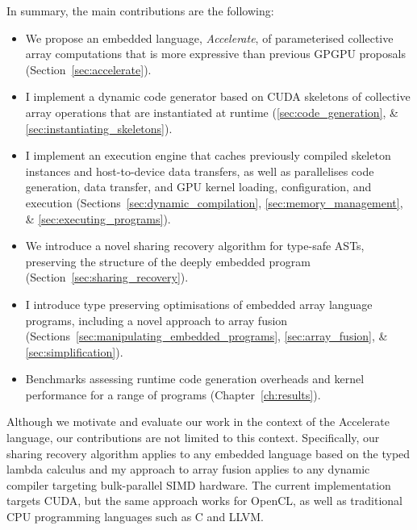 In summary, the main contributions are the following:
%
\begin{itemize}
    \item We propose an embedded language, \emph{Accelerate}, of parameterised
        collective array computations that is more expressive than previous
        GPGPU proposals (Section~\ref{sec:accelerate}).

    \item I implement a dynamic code generator based on CUDA skeletons of
        collective array operations that are instantiated at runtime
        (\ref{sec:code_generation}, \& \ref{sec:instantiating_skeletons}).

    \item I implement an execution engine that caches previously compiled
        skeleton instances and host-to-device data transfers, as well as
        parallelises code generation, data transfer, and GPU kernel loading,
        configuration, and execution (Sections~\ref{sec:dynamic_compilation},
        \ref{sec:memory_management}, \&
        \ref{sec:executing_programs}).

    \item We introduce a novel sharing recovery algorithm for type-safe ASTs,
        preserving the structure of the deeply embedded program
        (Section~\ref{sec:sharing_recovery}).

    \item I introduce type preserving optimisations of embedded array language
        programs, including a novel approach to array fusion
        (Sections~\ref{sec:manipulating_embedded_programs},
        \ref{sec:array_fusion}, \&
        \ref{sec:simplification}).

    \item Benchmarks assessing runtime code generation overheads and kernel
        performance for a range of programs (Chapter~\ref{ch:results}).
\end{itemize}

Although we motivate and evaluate our work in the context of the Accelerate
language, our contributions are not limited to this context. Specifically, our
sharing recovery algorithm applies to any embedded language based on the typed
lambda calculus and my approach to array fusion applies to any dynamic compiler
targeting bulk-parallel SIMD hardware. The current implementation targets CUDA,
but the same approach works for OpenCL, as well as traditional CPU programming
languages such as C and LLVM.

